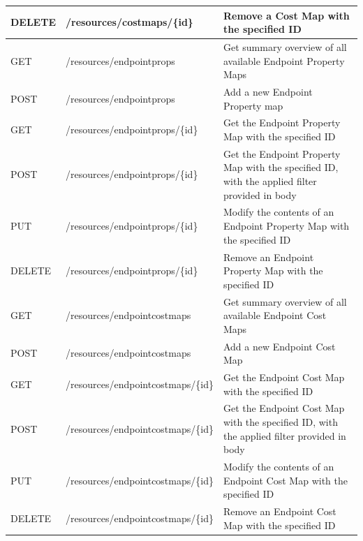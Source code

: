 \begin{table}[]
{\begin{tabular}{|l|l|l|}
DELETE    & /resources/costmaps/\{id\}         & Remove a Cost Map with the specified ID                                                       \\ \hline
GET       & /resources/endpointprops           & Get summary overview of all available Endpoint Property Maps                                  \\ \hline
POST      & /resources/endpointprops           & Add a new Endpoint Property map                                                               \\ \hline
GET       & /resources/endpointprops/\{id\}    & Get the Endpoint Property Map with the specified ID                                           \\ \hline
POST      & /resources/endpointprops/\{id\}    & Get the Endpoint Property Map with the specified ID, with the applied filter provided in body \\ \hline
PUT       & /resources/endpointprops/\{id\}    & Modify the contents of an Endpoint Property Map with the specified ID                         \\ \hline
DELETE    & /resources/endpointprops/\{id\}    & Remove an Endpoint Property Map with the specified ID                                         \\ \hline
GET       & /resources/endpointcostmaps        & Get summary overview of all available Endpoint Cost Maps                                      \\ \hline
POST      & /resources/endpointcostmaps        & Add a new Endpoint Cost Map                                                                   \\ \hline
GET       & /resources/endpointcostmaps/\{id\} & Get the Endpoint Cost Map with the specified ID                                               \\ \hline
POST      & /resources/endpointcostmaps/\{id\} & Get the Endpoint Cost Map with the specified ID, with the applied filter provided in body     \\ \hline
PUT       & /resources/endpointcostmaps/\{id\} & Modify the contents of an Endpoint Cost Map with the specified ID                             \\ \hline
DELETE    & /resources/endpointcostmaps/\{id\} & Remove an Endpoint Cost Map with the specified ID                                             \\ \hline
\end{tabular}}
\end{table}

